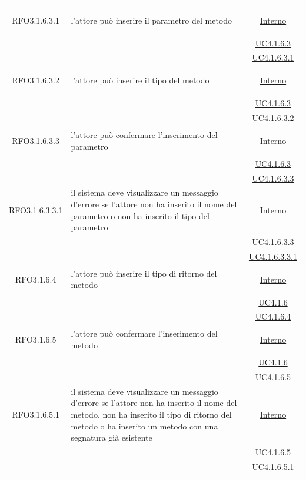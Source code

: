 \begin{longtable}{|c|>{\centering}m{7cm}|c|}
\hypertarget{RFO3.1.6.3.1}{RFO3.1.6.3.1} & l'attore può inserire il parametro del metodo &\hyperlink{Interno}{Interno}\\
& & \hyperref[UC4.1.6.3]{UC4.1.6.3}\\
& & \hyperref[UC4.1.6.3.1]{UC4.1.6.3.1}\\ \hline

\hypertarget{RFO3.1.6.3.2}{RFO3.1.6.3.2} & l'attore può inserire il tipo del metodo &\hyperlink{Interno}{Interno}\\
& &\hyperref[UC4.1.6.3]{UC4.1.6.3}\\
& &\hyperref[UC4.1.6.3.2]{UC4.1.6.3.2}\\ \hline

\hypertarget{RFO3.1.6.3.3}{RFO3.1.6.3.3} & l'attore può confermare l'inserimento del parametro & \hyperlink{Interno}{Interno}\\
& &\hyperref[UC4.1.6.3]{UC4.1.6.3}\\
& &\hyperref[UC4.1.6.3.3]{UC4.1.6.3.3}\\ \hline

\hypertarget{RFO3.1.6.3.3.1}{RFO3.1.6.3.3.1} & il sistema deve visualizzare un messaggio d'errore se l'attore non ha inserito il nome del parametro o non ha inserito il tipo del parametro &  \hyperlink{Interno}{Interno}\\
& &\hyperref[UC4.1.6.3.3]{UC4.1.6.3.3}\\
& &\hyperref[UC4.1.6.3.3.1]{UC4.1.6.3.3.1}\\ \hline

\hypertarget{RFO3.1.6.4}{RFO3.1.6.4} & l'attore può inserire il tipo di ritorno del metodo &  \hyperlink{Interno}{Interno}\\
& &\hyperref[UC4.1.6]{UC4.1.6}\\
& &\hyperref[UC4.1.6.4]{UC4.1.6.4}\\ \hline

\hypertarget{RFO3.1.6.5}{RFO3.1.6.5} & l'attore può confermare l'inserimento del metodo & \hyperlink{Interno}{Interno}\\
& &\hyperref[UC4.1.6]{UC4.1.6}\\
& &\hyperref[UC4.1.6.5]{UC4.1.6.5}\\ \hline

\hypertarget{RFO3.1.6.5.1}{RFO3.1.6.5.1} & il sistema deve visualizzare un messaggio d'errore se l'attore non ha inserito il nome del metodo, non ha inserito il tipo di ritorno del metodo o ha inserito un metodo con una segnatura già esistente & \hyperlink{Interno}{Interno}\\
& &\hyperref[UC4.1.6.5]{UC4.1.6.5}\\
& &\hyperref[UC4.1.6.5.1]{UC4.1.6.5.1}\\ \hline


\end{longtable}
